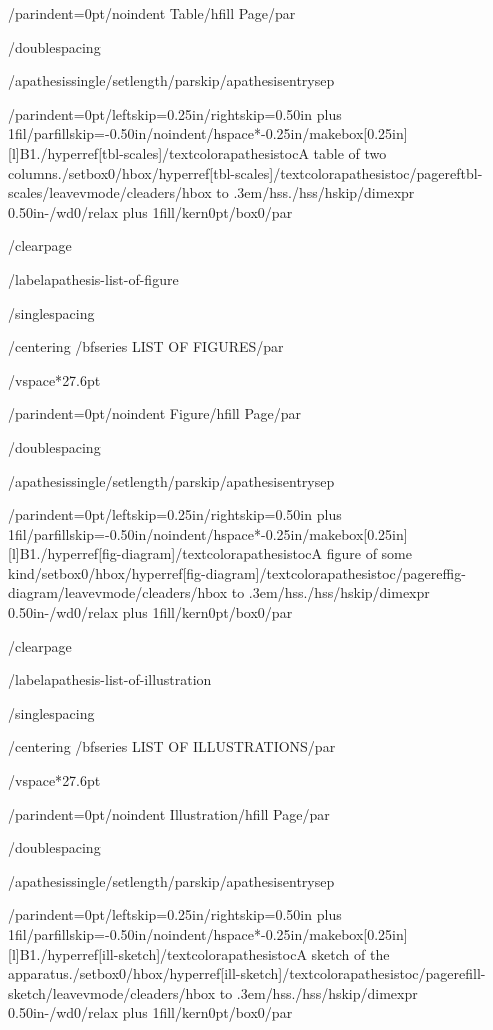 {/parindent=0pt/noindent Table/hfill Page/par}

/doublespacing

{/apathesissingle/setlength{/parskip}{/apathesisentrysep}

{/parindent=0pt/leftskip=0.25in/rightskip=0.50in plus 1fil/parfillskip=-0.50in/noindent/hspace*{-0.25in}/makebox[0.25in][l]{B1.}/hyperref[tbl-scales]{/textcolor{apathesistoc}{A table of two columns.}}/setbox0/hbox{/hyperref[tbl-scales]{/textcolor{apathesistoc}{/pageref{tbl-scales}}}}/leavevmode/cleaders/hbox to .3em{/hss./hss}/hskip/dimexpr 0.50in-/wd0/relax plus 1fill/kern0pt/box0/par}

}

/clearpage

/label{apathesis-list-of-figure}

/singlespacing

{/centering
/bfseries LIST OF FIGURES/par}

/vspace*{27.6pt}

{/parindent=0pt/noindent Figure/hfill Page/par}

/doublespacing

{/apathesissingle/setlength{/parskip}{/apathesisentrysep}

{/parindent=0pt/leftskip=0.25in/rightskip=0.50in plus 1fil/parfillskip=-0.50in/noindent/hspace*{-0.25in}/makebox[0.25in][l]{B1.}/hyperref[fig-diagram]{/textcolor{apathesistoc}{A figure of some kind}}/setbox0/hbox{/hyperref[fig-diagram]{/textcolor{apathesistoc}{/pageref{fig-diagram}}}}/leavevmode/cleaders/hbox to .3em{/hss./hss}/hskip/dimexpr 0.50in-/wd0/relax plus 1fill/kern0pt/box0/par}

}

/clearpage

/label{apathesis-list-of-illustration}

/singlespacing

{/centering
/bfseries LIST OF ILLUSTRATIONS/par}

/vspace*{27.6pt}

{/parindent=0pt/noindent Illustration/hfill Page/par}

/doublespacing

{/apathesissingle/setlength{/parskip}{/apathesisentrysep}

{/parindent=0pt/leftskip=0.25in/rightskip=0.50in plus 1fil/parfillskip=-0.50in/noindent/hspace*{-0.25in}/makebox[0.25in][l]{B1.}/hyperref[ill-sketch]{/textcolor{apathesistoc}{A sketch of the apparatus.}}/setbox0/hbox{/hyperref[ill-sketch]{/textcolor{apathesistoc}{/pageref{ill-sketch}}}}/leavevmode/cleaders/hbox to .3em{/hss./hss}/hskip/dimexpr 0.50in-/wd0/relax plus 1fill/kern0pt/box0/par}

}


